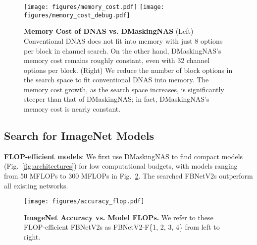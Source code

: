 \documentclass[10pt,twocolumn,letterpaper]{article}
\begin{document}
\begin{figure}
    \centering
    \texttt{[image: figures/memory\_cost.pdf]}
    \texttt{[image: figures/memory\_cost\_debug.pdf]}
    \caption{\textbf{Memory Cost of DNAS vs. DMaskingNAS} (Left) Conventional DNAS does not fit into memory with just 8 options per block in channel search. On the other hand, DMaskingNAS's memory cost remains roughly constant, even with 32 channel options per block. (Right) We reduce the number of block options in the search space to fit conventional DNAS into memory. The memory cost growth, as the search space increases, is significantly steeper than that of DMaskingNAS; in fact, DMaskingNAS's memory cost is nearly constant.}
    \label{fig:memory-cost}
\end{figure}

\subsection{Search for ImageNet Models}

\textbf{FLOP-efficient models}: We first use DMaskingNAS to find compact models (Fig.~\ref{fig:architectures}) for low computational budgets, with models ranging from 50 MFLOPs to 300 MFLOPs in Fig.~\ref{fig:results-flop-efficient}. The searched FBNetV2s outperform all existing networks.



\begin{figure}
    \centering
    \texttt{[image: figures/accuracy\_flop.pdf]}
    \caption{\textbf{ImageNet Accuracy vs. Model FLOPs.} We refer to these FLOP-efficient FBNetV2s as FBNetV2-F\{1, 2, 3, 4\} from left to right.} 
    \label{fig:results-flop-efficient}
\end{figure}
\end{document}
